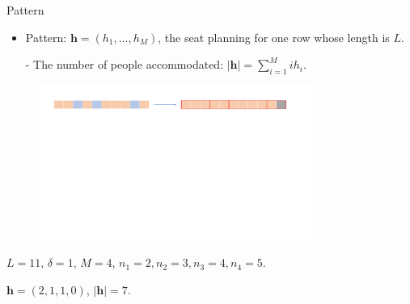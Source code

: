   \begin{frame}{Pattern}
    \begin{itemize}
      \item Pattern: $\bm{h} = (h_1, \ldots, h_M)$, the seat planning for one row whose length is $L$.

      - The number of people accommodated: $|\bm{h}| = \sum_{i =1}^{M} i h_i$.
    \end{itemize}
    
    \begin{figure}[ht]
      \centering
      \includegraphics[width = 0.8\textwidth]{./images/dummy_seat.pdf}
    \end{figure}
    \centering
    $L = 11$, $\delta =1$, $M =4$, $n_1 = 2, n_2 = 3, n_3 = 4, n_4 = 5$. 

    $\bm{h} = (2, 1, 1, 0)$, $|\bm{h}| = 7$.
  \end{frame}

